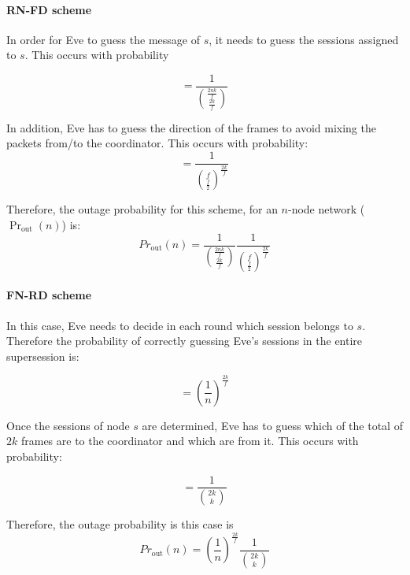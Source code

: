 \documentclass[10pt,letterpaper,conference]{IEEEtran}
\begin{document}
\paragraph{\textbf{RN-FD scheme}}
In order for Eve to guess the message of $s$, it needs to guess the sessions
assigned to $s$. This occurs with probability

\begin{equation}
=\frac{1}{\binom{\frac{2nk}{f}}{\frac{2k}{f}}}
\label{R_S}
\end{equation}

In addition, Eve has to guess the direction of the frames to avoid mixing the
packets from/to the coordinator. This occurs with probability:
\begin{equation}
={\frac{1}{\binom{f}{\frac{f}{2}}^{\frac{2k}{f}}}}
\label{F_T}
\end{equation}

Therefore, the outage probability for this scheme, for an $n$-node network
($\Pr_{\textrm{out}}(n)$) is:
\begin{equation}
Pr_{\textrm{out}}(n)=\left.\frac{1}{\binom{\frac{2nk}{f}}{\frac{2k}{f}}}\right.
{\frac{1}{\binom{f}{\frac{f}{2}}^{\frac{2k}{f}}}}
\end{equation}

\paragraph{\textbf{FN-RD scheme}}
In this case, Eve needs to decide in each round which session belongs to $s$.
Therefore the probability of correctly guessing Eve's sessions in the entire
supersession is:

\begin{equation}
={\left(\frac{1}{n}\right)^{\frac{2k}{f}}}
\label{3R_S}
\end{equation}

Once the sessions of node $s$ are determined, Eve has to guess which of the total of $2k$
frames are to the coordinator and which are from it. This occurs with
probability:

\begin{equation}
={\frac{1}{\binom{2k}{k}}}
\label{R_T}
\end{equation}

Therefore, the outage probability is this case is
\begin{equation}
Pr_{\textrm{out}}(n)=\left.{\left(\frac{1}{n}\right)^{\frac{2k}{f}}}\right.{
\frac{1}{\binom{2k}{k}}}
\end{equation}
\end{document}
